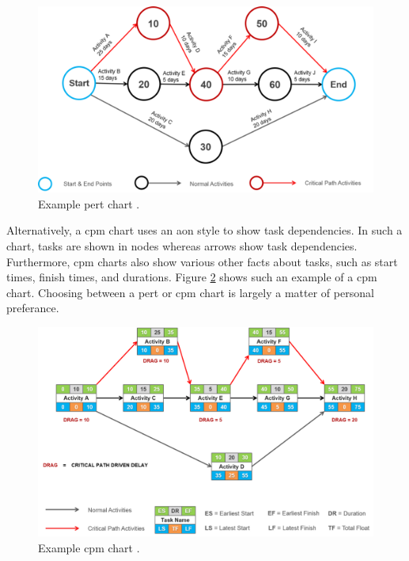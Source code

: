 \documentclass[11pt]{article}
\begin{document}
\begin{figure}[b!]
    \centering
    \includegraphics[width=\textwidth]{figures/pert.png}
    \caption{Example \acrshort{pert} chart \cite{pert}.}
    \label{fig:pert-chart}
\end{figure}

Alternatively, a \acrfull{cpm} chart uses an \acrfull{aon} style to show task dependencies. In such a chart, tasks are shown in nodes whereas arrows show task dependencies. Furthermore, \acrshort{cpm} charts also show various other facts about tasks, such as start times, finish times, and durations. Figure \ref{fig:cpm-chart} shows such an example of a \acrshort{cpm} chart. Choosing between a \acrshort{pert} or \acrshort{cpm} chart is largely a matter of personal preferance.

\begin{figure}[t!]
    \centering
    \includegraphics[width=\textwidth]{figures/cpm.png}
    \caption{Example \acrshort{cpm} chart \cite{cpm}.}
    \label{fig:cpm-chart}
\end{figure}
\end{document}
